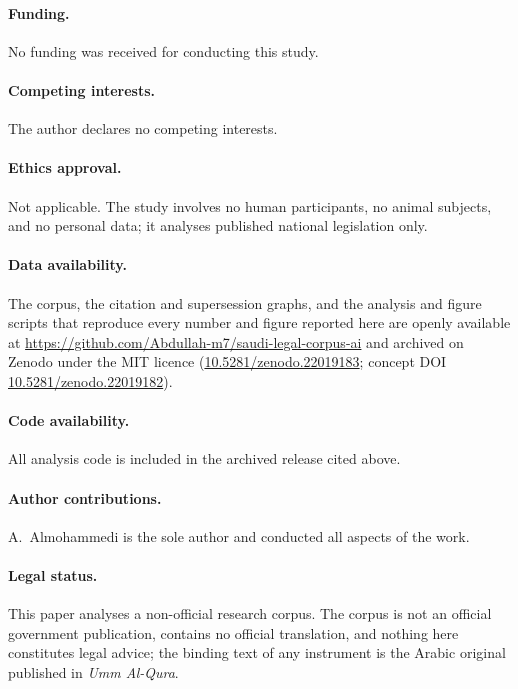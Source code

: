 \documentclass[sn-basic]{sn-jnl}%
\begin{document}
\paragraph{Funding.} No funding was received for conducting this study.

\paragraph{Competing interests.} The author declares no competing interests.

\paragraph{Ethics approval.} Not applicable. The study involves no human
participants, no animal subjects, and no personal data; it analyses
published national legislation only.

\paragraph{Data availability.} The corpus, the citation and supersession
graphs, and the analysis and figure scripts that reproduce every number and
figure reported here are openly available at
\url{https://github.com/Abdullah-m7/saudi-legal-corpus-ai} and archived on
Zenodo under the MIT licence
(\href{https://doi.org/10.5281/zenodo.22019183}{10.5281/zenodo.22019183};
concept DOI
\href{https://doi.org/10.5281/zenodo.22019182}{10.5281/zenodo.22019182}).

\paragraph{Code availability.} All analysis code is included in the archived
release cited above.

\paragraph{Author contributions.} A.~Almohammedi is the sole author and
conducted all aspects of the work.

\paragraph{Legal status.} This paper analyses a non-official research corpus.
The corpus is not an official government publication, contains no official
translation, and nothing here constitutes legal advice; the binding text of
any instrument is the Arabic original published in \emph{Umm Al-Qura}.



\end{document}
